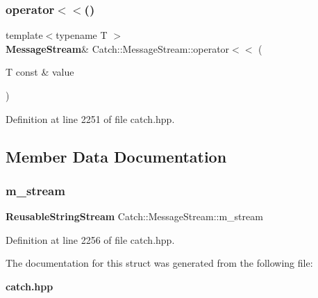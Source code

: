 \subsubsection{operator$<$$<$()}
{\footnotesize\ttfamily template$<$typename T $>$ \\
\textbf{ Message\+Stream}\& Catch\+::\+Message\+Stream\+::operator$<$$<$ (\begin{DoxyParamCaption}\item[{T const \&}]{value }\end{DoxyParamCaption})\hspace{0.3cm}{\ttfamily [inline]}}



Definition at line 2251 of file catch.\+hpp.



\subsection{Member Data Documentation}
\mbox{\label{struct_catch_1_1_message_stream_a9202520faed8882ef469db9f353ec578}} 
\subsubsection{m\_stream}
{\footnotesize\ttfamily \textbf{ Reusable\+String\+Stream} Catch\+::\+Message\+Stream\+::m\+\_\+stream}



Definition at line 2256 of file catch.\+hpp.



The documentation for this struct was generated from the following file\+:\begin{DoxyCompactItemize}
\item 
\textbf{ catch.\+hpp}\end{DoxyCompactItemize}
